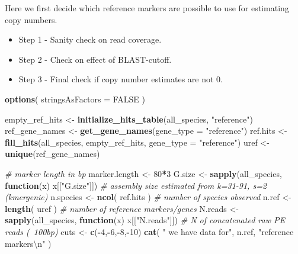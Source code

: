 \documentclass[]{article}
\newenvironment{Shaded}{\begin{snugshade}}{\end{snugshade}}
\newcommand{\KeywordTok}[1]{\textcolor[rgb]{0.13,0.29,0.53}{\textbf{#1}}}
\newcommand{\DataTypeTok}[1]{\textcolor[rgb]{0.13,0.29,0.53}{#1}}
\newcommand{\DecValTok}[1]{\textcolor[rgb]{0.00,0.00,0.81}{#1}}
\newcommand{\CharTok}[1]{\textcolor[rgb]{0.31,0.60,0.02}{#1}}
\newcommand{\StringTok}[1]{\textcolor[rgb]{0.31,0.60,0.02}{#1}}
\newcommand{\CommentTok}[1]{\textcolor[rgb]{0.56,0.35,0.01}{\textit{#1}}}
\newcommand{\OtherTok}[1]{\textcolor[rgb]{0.56,0.35,0.01}{#1}}
\newcommand{\ControlFlowTok}[1]{\textcolor[rgb]{0.13,0.29,0.53}{\textbf{#1}}}
\newcommand{\OperatorTok}[1]{\textcolor[rgb]{0.81,0.36,0.00}{\textbf{#1}}}
\newcommand{\NormalTok}[1]{#1}
\providecommand{\tightlist}{%
  \setlength{\itemsep}{0pt}\setlength{\parskip}{0pt}}
\begin{document}
Here we first decide which reference markers are possible to use for
estimating copy numbers.

\begin{itemize}
\tightlist
\item
  Step 1 - Sanity check on read coverage.
\item
  Step 2 - Check on effect of BLAST-cutoff.
\item
  Step 3 - Final check if copy number estimates are not 0.
\end{itemize}

\begin{Shaded}
\begin{Highlighting}[]
\KeywordTok{options}\NormalTok{( }\DataTypeTok{stringsAsFactors =} \OtherTok{FALSE}\NormalTok{ )}

\NormalTok{empty_ref_hits <-}\StringTok{ }\KeywordTok{initialize_hits_table}\NormalTok{(all_species, }\StringTok{"reference"}\NormalTok{)}
\NormalTok{ref_gene_names <-}\StringTok{ }\KeywordTok{get_gene_names}\NormalTok{(}\DataTypeTok{gene_type =} \StringTok{"reference"}\NormalTok{)}
\NormalTok{ref.hits <-}\StringTok{ }\KeywordTok{fill_hits}\NormalTok{(all_species, empty_ref_hits, }\DataTypeTok{gene_type =} \StringTok{"reference"}\NormalTok{)}
\NormalTok{uref <-}\StringTok{ }\KeywordTok{unique}\NormalTok{(ref_gene_names)}

\CommentTok{# marker length in bp}
\NormalTok{marker.length <-}\StringTok{ }\DecValTok{80}\OperatorTok{*}\DecValTok{3}                            
\NormalTok{G.size <-}\StringTok{ }\KeywordTok{sapply}\NormalTok{(all_species, }\ControlFlowTok{function}\NormalTok{(x) x[[}\StringTok{"G.size"}\NormalTok{]])   }\CommentTok{# assembly size estimated from k=31-91, s=2 (kmergenie)}
\NormalTok{n.species <-}\StringTok{ }\KeywordTok{ncol}\NormalTok{( ref.hits )                       }\CommentTok{# number of species observed }
\NormalTok{n.ref <-}\StringTok{ }\KeywordTok{length}\NormalTok{( uref )                          }\CommentTok{# number of reference markers/genes}
\NormalTok{N.reads <-}\StringTok{ }\KeywordTok{sapply}\NormalTok{(all_species, }\ControlFlowTok{function}\NormalTok{(x) x[[}\StringTok{"N.reads"}\NormalTok{]])   }\CommentTok{# N of concatenated raw PE reads (~100bp)}
\NormalTok{cuts <-}\StringTok{ }\KeywordTok{c}\NormalTok{(}\OperatorTok{-}\DecValTok{4}\NormalTok{,}\OperatorTok{-}\DecValTok{6}\NormalTok{,}\OperatorTok{-}\DecValTok{8}\NormalTok{,}\OperatorTok{-}\DecValTok{10}\NormalTok{)}
\KeywordTok{cat}\NormalTok{( }\StringTok{"   we have data for"}\NormalTok{, n.ref, }\StringTok{"reference markers}\CharTok{\textbackslash{}n}\StringTok{"}\NormalTok{ )}
\end{Highlighting}
\end{Shaded}
\end{document}
